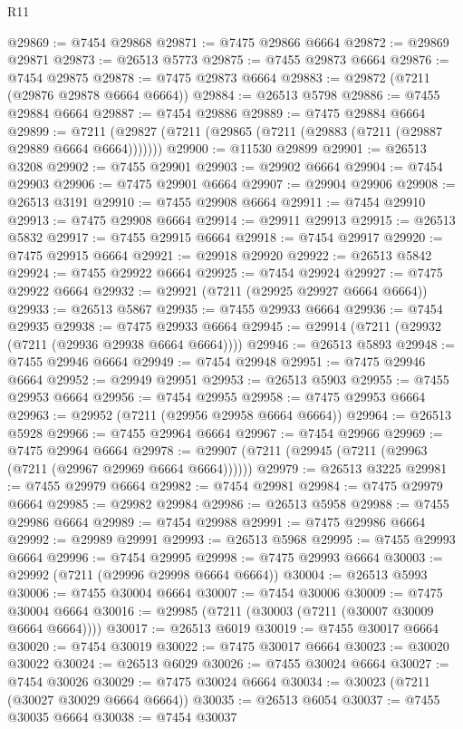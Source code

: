 \begin{lexlean}{R11}
\begin{coremodule}
@29869 := @7454 @29868
@29871 := @7475 @29866 @6664
@29872 := @29869 @29871
@29873 := @26513 @5773
@29875 := @7455 @29873 @6664
@29876 := @7454 @29875
@29878 := @7475 @29873 @6664
@29883 := @29872 (@7211 (@29876 @29878 @6664 @6664))
@29884 := @26513 @5798
@29886 := @7455 @29884 @6664
@29887 := @7454 @29886
@29889 := @7475 @29884 @6664
@29899 := @7211 (@29827 (@7211 (@29865 (@7211 (@29883 (@7211 (@29887 @29889 @6664 @6664)))))))
@29900 := @11530 @29899
@29901 := @26513 @3208
@29902 := @7455 @29901
@29903 := @29902 @6664
@29904 := @7454 @29903
@29906 := @7475 @29901 @6664
@29907 := @29904 @29906
@29908 := @26513 @3191
@29910 := @7455 @29908 @6664
@29911 := @7454 @29910
@29913 := @7475 @29908 @6664
@29914 := @29911 @29913
@29915 := @26513 @5832
@29917 := @7455 @29915 @6664
@29918 := @7454 @29917
@29920 := @7475 @29915 @6664
@29921 := @29918 @29920
@29922 := @26513 @5842
@29924 := @7455 @29922 @6664
@29925 := @7454 @29924
@29927 := @7475 @29922 @6664
@29932 := @29921 (@7211 (@29925 @29927 @6664 @6664))
@29933 := @26513 @5867
@29935 := @7455 @29933 @6664
@29936 := @7454 @29935
@29938 := @7475 @29933 @6664
@29945 := @29914 (@7211 (@29932 (@7211 (@29936 @29938 @6664 @6664))))
@29946 := @26513 @5893
@29948 := @7455 @29946 @6664
@29949 := @7454 @29948
@29951 := @7475 @29946 @6664
@29952 := @29949 @29951
@29953 := @26513 @5903
@29955 := @7455 @29953 @6664
@29956 := @7454 @29955
@29958 := @7475 @29953 @6664
@29963 := @29952 (@7211 (@29956 @29958 @6664 @6664))
@29964 := @26513 @5928
@29966 := @7455 @29964 @6664
@29967 := @7454 @29966
@29969 := @7475 @29964 @6664
@29978 := @29907 (@7211 (@29945 (@7211 (@29963 (@7211 (@29967 @29969 @6664 @6664))))))
@29979 := @26513 @3225
@29981 := @7455 @29979 @6664
@29982 := @7454 @29981
@29984 := @7475 @29979 @6664
@29985 := @29982 @29984
@29986 := @26513 @5958
@29988 := @7455 @29986 @6664
@29989 := @7454 @29988
@29991 := @7475 @29986 @6664
@29992 := @29989 @29991
@29993 := @26513 @5968
@29995 := @7455 @29993 @6664
@29996 := @7454 @29995
@29998 := @7475 @29993 @6664
@30003 := @29992 (@7211 (@29996 @29998 @6664 @6664))
@30004 := @26513 @5993
@30006 := @7455 @30004 @6664
@30007 := @7454 @30006
@30009 := @7475 @30004 @6664
@30016 := @29985 (@7211 (@30003 (@7211 (@30007 @30009 @6664 @6664))))
@30017 := @26513 @6019
@30019 := @7455 @30017 @6664
@30020 := @7454 @30019
@30022 := @7475 @30017 @6664
@30023 := @30020 @30022
@30024 := @26513 @6029
@30026 := @7455 @30024 @6664
@30027 := @7454 @30026
@30029 := @7475 @30024 @6664
@30034 := @30023 (@7211 (@30027 @30029 @6664 @6664))
@30035 := @26513 @6054
@30037 := @7455 @30035 @6664
@30038 := @7454 @30037

\end{coremodule}
\end{lexlean}
